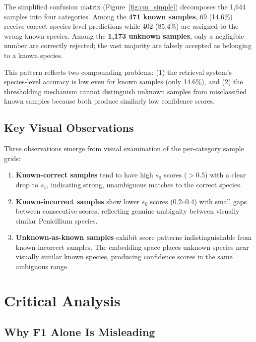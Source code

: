 \documentclass[11pt,a4paper]{article}
\begin{document}
\noindent The simplified confusion matrix (Figure~\ref{fig:cm_simple}) decomposes the 1{,}644 samples into four categories. Among the \textbf{471 known samples}, 69 (14.6\%) receive correct species-level predictions while 402 (85.4\%) are assigned to the wrong known species. Among the \textbf{1{,}173 unknown samples}, only a negligible number are correctly rejected; the vast majority are falsely accepted as belonging to a known species.

This pattern reflects two compounding problems: (1) the retrieval system's species-level accuracy is low even for known samples (only 14.6\%), and (2) the thresholding mechanism cannot distinguish unknown samples from misclassified known samples because both produce similarly low confidence scores.

\subsection{Key Visual Observations}

Three observations emerge from visual examination of the per-category sample grids:

\begin{enumerate}
  \item \textbf{Known-correct samples} tend to have high $s_0$ scores ($>$0.5) with a clear drop to $s_1$, indicating strong, unambiguous matches to the correct species.
  \item \textbf{Known-incorrect samples} show lower $s_0$ scores (0.2--0.4) with small gaps between consecutive scores, reflecting genuine ambiguity between visually similar Penicillium species.
  \item \textbf{Unknown-as-known samples} exhibit score patterns indistinguishable from known-incorrect samples. The embedding space places unknown species near visually similar known species, producing confidence scores in the same ambiguous range.
\end{enumerate}


\section{Critical Analysis}

\subsection{Why F1 Alone Is Misleading}
\end{document}
